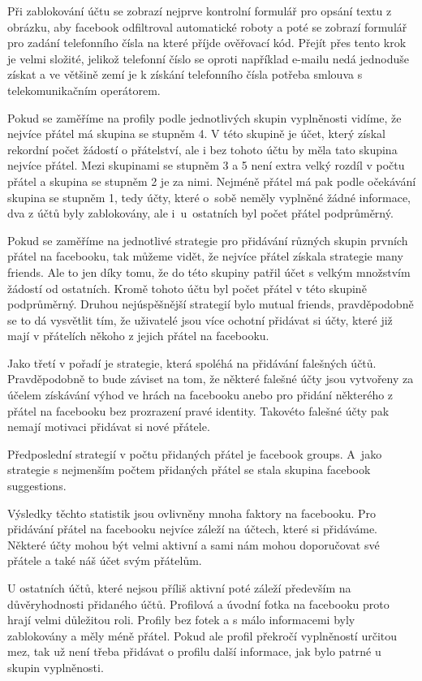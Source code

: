 \documentclass[thesis=M,czech]{FITthesis}[2013/05/10]
\begin{document}
Při zablokování účtu se zobrazí nejprve kontrolní formulář pro opsání textu z obrázku, aby facebook odfiltroval automatické roboty a poté se zobrazí formulář pro zadání telefonního čísla na které příjde ověřovací kód. Přejít přes tento krok je velmi složité, jelikož telefonní číslo se oproti například e-mailu nedá jednoduše získat a ve většině zemí je k získání telefonního čísla potřeba smlouva s telekomunikačním operátorem.


Pokud se zaměříme na profily podle jednotlivých skupin vyplněnosti vidíme, že nejvíce přátel má skupina se stupněm 4. V této skupině je účet, který získal rekordní počet žádostí o přátelství, ale i bez tohoto účtu by měla tato skupina nejvíce přátel. Mezi skupinami se stupněm 3 a 5 není extra velký rozdíl v počtu přátel a skupina se stupněm 2 je za nimi. Nejméně přátel má pak podle očekávání skupina se stupněm 1, tedy účty, které o~sobě neměly vyplněné žádné informace, dva z účtů byly zablokovány, ale i~u~ostatních byl počet přátel podprůměrný.


Pokud se zaměříme na jednotlivé strategie pro přidávání různých skupin prvních přátel na facebooku, tak můžeme vidět, že nejvíce přátel získala strategie many friends. Ale to jen díky tomu, že do této skupiny patřil účet s velkým množstvím žádostí od ostatních. Kromě tohoto účtu byl počet přátel v této skupině podprůměrný. Druhou nejúspěšnější strategií bylo mutual friends, pravděpodobně se to dá vysvětlit tím, že uživatelé jsou více ochotní přidávat si účty, které již mají v přátelích někoho z jejich přátel na facebooku.

Jako třetí v pořadí je strategie, která spoléhá na přidávání falešných účtů. Pravděpodobně to bude záviset na tom, že některé falešné účty jsou vytvořeny za účelem získávání výhod ve hrách na facebooku anebo pro přidání některého z přátel na facebooku bez prozrazení pravé identity. Takovéto falešné účty pak nemají motivaci přidávat si nové přátele.

Předposlední strategií v počtu přidaných přátel je facebook groups. A~jako strategie s nejmenším počtem přidaných přátel se stala skupina facebook suggestions. 

Výsledky těchto statistik jsou ovlivněny mnoha faktory na facebooku. Pro přidávání přátel na facebooku nejvíce záleží na účtech, které si přidáváme. Některé účty mohou být velmi aktivní a sami nám mohou doporučovat své přátele a také náš účet svým přátelům. 

U ostatních účtů, které nejsou příliš aktivní poté záleží především na důvěryhodnosti přidaného účtů. Profilová a úvodní fotka na facebooku proto hrají velmi důležitou roli. Profily bez fotek a s málo informacemi byly zablokovány a měly méně přátel. Pokud ale profil překročí vyplněností určitou mez, tak už není třeba přidávat o profilu další informace, jak bylo patrné u skupin vyplněnosti.
\end{document}
